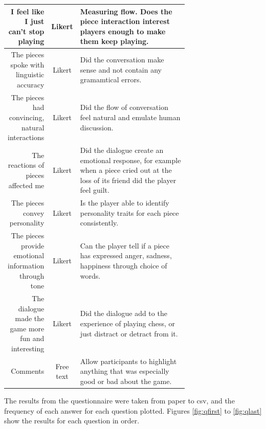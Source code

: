 \documentclass{article}
\begin{document}
\begin{table}[!ht]
{{\begin{tabular}{ r|c|p{0.7\linewidth} }
\hline
		I feel like I just can't stop playing & Likert & Measuring flow. Does the piece interaction interest players enough to make them keep playing. \\
\hline
		The pieces spoke with linguistic accuracy & Likert & Did the conversation make sense and not contain any gramamtical errors. \\
\hline
		The pieces had convincing, natural interactions & Likert & Did the flow of conversation feel natural and emulate human discussion.  \\
\hline
		The reactions of pieces affected me & Likert & Did the dialogue create an emotional response, for example when a piece cried out at the loss of its friend did the player feel guilt. \\
\hline
		The pieces convey personality & Likert & Is the player able to identify personality traits for each piece consistently. \\
\hline
		The pieces provide emotional information through tone & Likert & Can the player tell if a piece has expressed anger, sadness, happiness through choice of words. \\
\hline
		The dialogue made the game more fun and interesting & Likert & Did the dialogue add to the experience of playing chess, or just distract or detract from it. \\
\hline
		Comments & Free text & Allow participants to highlight anything that was especially good or bad about the game. \\
 \hline
\end{tabular}}}
\end{table}

The results from the questionnaire were taken from paper to csv, and the frequency of each answer for each question plotted. Figures \ref{fig:qfirst} to \ref{fig:qlast} show the results for each question in order.
\end{document}
